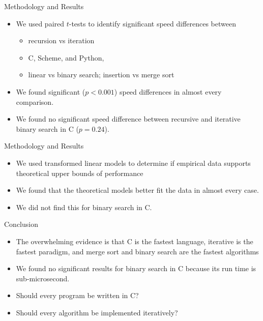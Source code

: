 \documentclass[]{beamer}
\begin{document}
\begin{frame}[t]{Methodology and Results}
\begin{itemize}
	\item We used paired $t$-tests to identify significant speed differences between
    \begin{itemize}
		\item recursion vs iteration
        \item C, Scheme, and Python,
        \item linear vs binary search; insertion vs merge sort
\end{itemize}
	\item We found significant ($p < 0.001$) speed differences in almost every comparison.
    \item We found no significant speed difference between recursive and iterative binary search in C ($p = 0.24$).
\end{itemize}
\end{frame}

\begin{frame}[t]{Methodology and Results}
\begin{itemize}
    \item We used transformed linear models to determine if empirical data supports theoretical upper bounds of performance
    \item We found that the theoretical models better fit the data in almost every case.
    \item We did not find this for binary search in C.
\end{itemize}
\end{frame}

\begin{frame}[t]{Conclusion}
\begin{itemize}
	\item The overwhelming evidence is that C is the fastest language, iterative is the fastest paradigm, and merge sort and binary search are the fastest algorithms
    \item We found no significant results for binary search in C because its run time is sub-microsecond.
    \item Should every program be written in C?
    \item Should every algorithm be implemented iteratively?
\end{itemize}
\end{frame}
\end{document}
